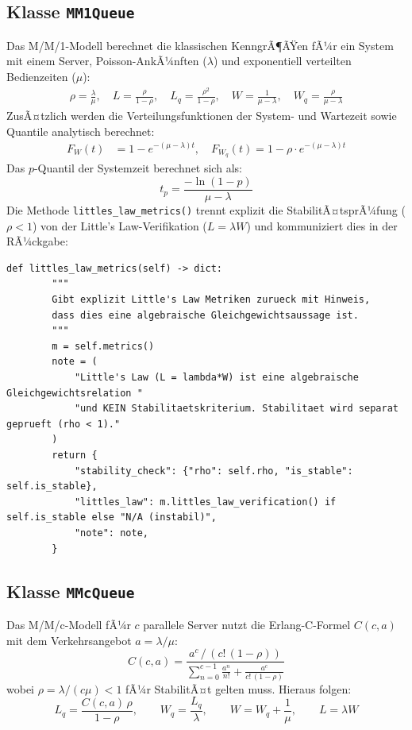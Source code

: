 ﻿\documentclass[a4paper,12pt]{report}
\theoremstyle{definition}
\begin{document}
\subsection{Klasse \texttt{MM1Queue}}

Das M/M/1-Modell berechnet die klassischen KenngrÃ¶ÃŸen fÃ¼r ein System
mit einem Server, Poisson-AnkÃ¼nften ($\lambda$) und exponentiell
verteilten Bedienzeiten ($\mu$):
\begin{align}
	\rho = \frac{\lambda}{\mu}, \quad
	L = \frac{\rho}{1-\rho}, \quad
	L_q = \frac{\rho^2}{1-\rho}, \quad
	W = \frac{1}{\mu-\lambda}, \quad
	W_q = \frac{\rho}{\mu-\lambda}
\end{align}
ZusÃ¤tzlich werden die Verteilungsfunktionen der System- und Wartezeit
sowie Quantile analytisch berechnet:
\begin{align}
	F_W(t) &= 1 - e^{-(\mu-\lambda)t}, \quad
	F_{W_q}(t) = 1 - \rho \cdot e^{-(\mu-\lambda)t}
\end{align}
Das $p$-Quantil der Systemzeit berechnet sich als:
\begin{equation}
	t_p = \frac{-\ln(1-p)}{\mu - \lambda}
\end{equation}
Die Methode \texttt{littles\_law\_metrics()} trennt explizit die StabilitÃ¤tsprÃ¼fung
($\rho < 1$) von der Little's Law-Verifikation ($L = \lambda W$) und
kommuniziert dies in der RÃ¼ckgabe:

\begin{lstlisting}[style=python, caption={MM1Queue: Getrennte StabilitÃ¤ts- und Little's Law-Analyse}, label=lst:mm1-littles]
def littles_law_metrics(self) -> dict:
        """
        Gibt explizit Little's Law Metriken zurueck mit Hinweis,
        dass dies eine algebraische Gleichgewichtsaussage ist.
        """
        m = self.metrics()
        note = (
            "Little's Law (L = lambda*W) ist eine algebraische Gleichgewichtsrelation "
            "und KEIN Stabilitaetskriterium. Stabilitaet wird separat geprueft (rho < 1)."
        )
        return {
            "stability_check": {"rho": self.rho, "is_stable": self.is_stable},
            "littles_law": m.littles_law_verification() if self.is_stable else "N/A (instabil)",
            "note": note,
        }
\end{lstlisting}

\subsection{Klasse \texttt{MMcQueue}}

Das M/M/c-Modell fÃ¼r $c$ parallele Server nutzt die Erlang-C-Formel
$C(c, a)$ mit dem Verkehrsangebot $a = \lambda/\mu$:
\begin{equation}
	C(c, a) = \frac{a^c \,/\, (c!\,(1-\rho))}
	{\displaystyle\sum_{n=0}^{c-1} \frac{a^n}{n!} + \frac{a^c}{c!\,(1-\rho)}}
\end{equation}
wobei $\rho = \lambda/(c\mu) < 1$ fÃ¼r StabilitÃ¤t gelten muss.
Hieraus folgen:
\begin{equation}
	L_q = \frac{C(c,a)\,\rho}{1-\rho}, \qquad
	W_q = \frac{L_q}{\lambda}, \qquad
	W = W_q + \frac{1}{\mu}, \qquad
	L = \lambda W
\end{equation}
\end{document}
